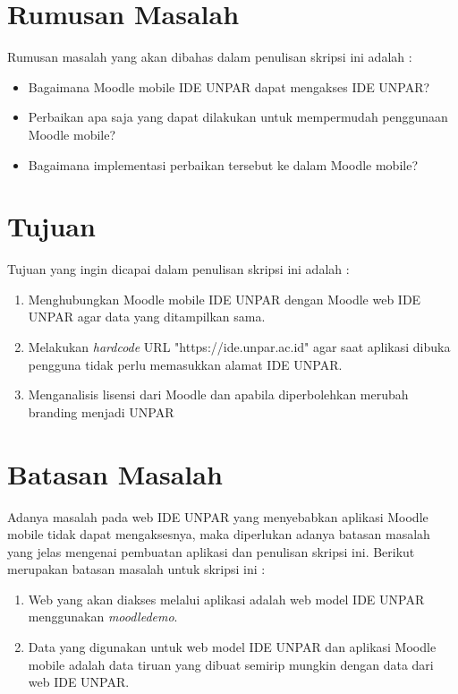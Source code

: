 \section{Rumusan Masalah}
\label{sec:rumusan}
Rumusan masalah yang akan dibahas dalam penulisan skripsi ini adalah :
\begin{itemize}
	\item Bagaimana Moodle mobile IDE UNPAR dapat mengakses IDE UNPAR?
	\item Perbaikan apa saja yang dapat dilakukan untuk mempermudah penggunaan Moodle mobile?
	\item Bagaimana implementasi perbaikan tersebut ke dalam Moodle mobile?
\end{itemize}

\section{Tujuan}
\label{sec:tujuan}
Tujuan yang ingin dicapai dalam penulisan skripsi ini adalah :
\begin{enumerate}
	\item Menghubungkan Moodle mobile IDE UNPAR dengan Moodle web IDE UNPAR agar data yang ditampilkan sama.
	\item Melakukan \textit{hardcode} URL "https://ide.unpar.ac.id" agar saat aplikasi dibuka pengguna tidak perlu memasukkan alamat IDE UNPAR.
	\item Menganalisis lisensi dari Moodle dan apabila diperbolehkan merubah branding menjadi UNPAR
\end{enumerate}

\section{Batasan Masalah}
\label{sec:batasan}
Adanya masalah pada web IDE UNPAR yang menyebabkan aplikasi Moodle mobile tidak dapat mengaksesnya, maka diperlukan adanya batasan masalah yang jelas mengenai pembuatan aplikasi dan penulisan skripsi ini. Berikut merupakan batasan masalah untuk skripsi ini :
\begin{enumerate}
	\item Web yang akan diakses melalui aplikasi adalah web model IDE UNPAR menggunakan \textit{moodledemo}.
	\item Data yang digunakan untuk web model IDE UNPAR dan aplikasi Moodle mobile adalah data tiruan yang dibuat semirip mungkin dengan data dari web IDE UNPAR.
\end{enumerate}

